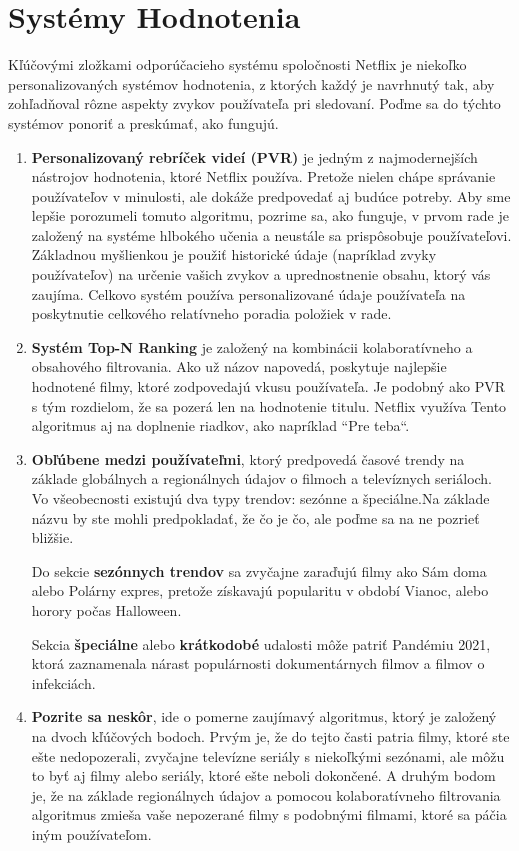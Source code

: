 \documentclass[10pt,slovak,a4paper]{article}
\begin{document}
\section{Systémy Hodnotenia}
 Kľúčovými zložkami odporúčacieho systému spoločnosti Netflix je niekoľko personalizovaných systémov hodnotenia, z ktorých každý je navrhnutý tak, aby zohľadňoval rôzne aspekty zvykov používateľa pri sledovaní. Poďme sa do týchto systémov ponoriť a preskúmať, ako fungujú.
\begin{enumerate}
    \item \textbf{Personalizovaný rebríček videí (PVR)} je jedným z najmodernejších  nástrojov\cite{Hodnotenie} hodnotenia, ktoré Netflix používa. Pretože nielen chápe správanie používateľov v minulosti, ale dokáže predpovedať aj budúce potreby. Aby sme lepšie porozumeli tomuto algoritmu, pozrime sa, ako funguje, v prvom rade je založený na systéme hlbokého učenia a neustále sa prispôsobuje používateľovi. Základnou myšlienkou je použiť historické údaje (napríklad zvyky používateľov) na určenie vašich zvykov a uprednostnenie obsahu, ktorý vás zaujíma. Celkovo systém používa personalizované údaje používateľa na poskytnutie celkového relatívneho poradia položiek v rade.

    \item \textbf{Systém Top-N Ranking} je založený na kombinácii kolaboratívneho a obsahového filtrovania. Ako už názov napovedá, poskytuje najlepšie hodnotené filmy, ktoré zodpovedajú vkusu používateľa. Je podobný ako PVR s tým rozdielom, že sa pozerá len na hodnotenie titulu. Netflix využíva Tento algoritmus aj na doplnenie riadkov, ako napríklad  “Pre teba“.

    \item\textbf{Obľúbene medzi používateľmi}, ktorý predpovedá časové trendy na základe globálnych a regionálnych údajov o filmoch a televíznych seriáloch. Vo všeobecnosti existujú dva typy trendov: sezónne a špeciálne.Na základe názvu by ste mohli predpokladať, že čo je čo, ale poďme sa na ne pozrieť bližšie.
    
    Do sekcie \textbf{sezónnych trendov} sa zvyčajne zaraďujú filmy ako Sám doma alebo Polárny expres, pretože získavajú popularitu v období Vianoc, alebo horory počas Halloween.

    Sekcia \textbf{špeciálne} alebo \textbf{krátkodobé} udalosti môže patriť Pandémiu 2021, ktorá zaznamenala nárast populárnosti dokumentárnych filmov a filmov o infekciách.

    \item \textbf{Pozrite sa neskôr}, ide o pomerne zaujímavý algoritmus, ktorý je založený na dvoch kľúčových bodoch. Prvým je, že do tejto časti patria filmy, ktoré ste ešte nedopozerali, zvyčajne televízne seriály s niekoľkými sezónami, ale môžu to byť aj filmy alebo seriály, ktoré ešte neboli dokončené. A druhým bodom je, že na základe regionálnych údajov a pomocou kolaboratívneho filtrovania algoritmus zmieša vaše nepozerané filmy s podobnými filmami, ktoré sa páčia iným používateľom.
    
\end{enumerate}
\end{document}
